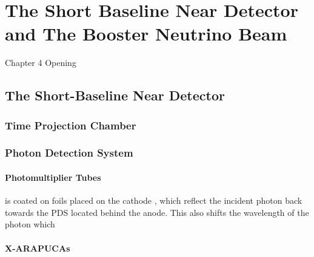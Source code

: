\chapter{The Short Baseline Near Detector and The Booster Neutrino Beam}

\ifpdf
    \graphicspath{{Chapter4/Figs/Raster/}{Chapter4/Figs/PDF/}{Chapter4/Figs/}}
\else
    \graphicspath{{Chapter4/Figs/Vector/}{Chapter4/Figs/}}
\fi


Chapter 4 Opening

\newpage

\section{The Short-Baseline Near Detector}



\subsection{Time Projection Chamber}

\subsection{Photon Detection System}

\subsubsection{Photomultiplier Tubes}
is coated on foils placed on the cathode
, which reflect the incident photon back towards the PDS located behind the anode. 
This also shifts the wavelength of the photon which 

\subsubsection{X-ARAPUCAs}


